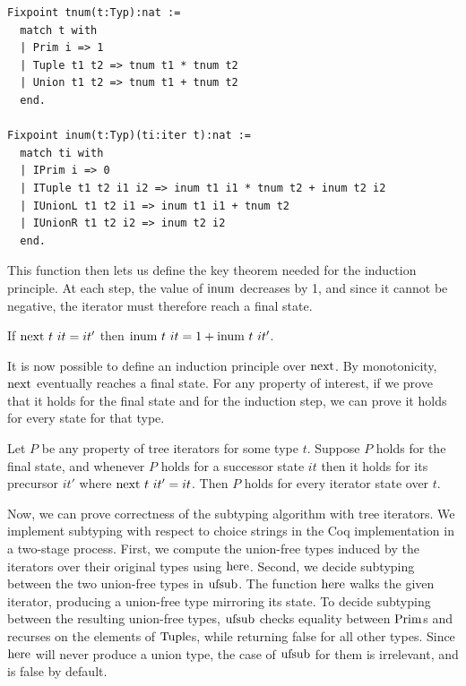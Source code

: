 \documentclass[a4paper,english]{lipics-v2019}
\renewcommand{\c}[1]{\ensuremath{\text{\lstinline{#1}}}\xspace}
\begin{document}
\begin{lstlisting}
Fixpoint tnum(t:Typ):nat :=
  match t with
  | Prim i => 1
  | Tuple t1 t2 => tnum t1 * tnum t2
  | Union t1 t2 => tnum t1 + tnum t2
  end.

Fixpoint inum(t:Typ)(ti:iter t):nat :=
  match ti with
  | IPrim i => 0
  | ITuple t1 t2 i1 i2 => inum t1 i1 * tnum t2 + inum t2 i2
  | IUnionL t1 t2 i1 => inum t1 i1 + tnum t2
  | IUnionR t1 t2 i2 => inum t2 i2
  end.
\end{lstlisting}

\noindent This function then lets us define the key theorem needed for the
induction principle. At each step, the value of \c{inum} decreases by 1, and
since it cannot be negative, the iterator must therefore reach a final
state.

\begin{lemma}[Monotonicity]\label{inum_mono}
If $\c{next}~t~it = it'$ then $\c{inum}~t~it = 1 + \c{inum}~t~it'$.
\end{lemma}

\noindent
It is now possible to define an induction principle over \c{next}. By
monotonicity, \c{next} eventually reaches a final state.  For any property
of interest, if we prove that it holds for the final state and for the
induction step, we can prove it holds for every state for that type.

\begin{theorem}\label{indprop}
Let $P$ be any property of tree iterators for some type $t$.  Suppose $P$
holds for the final state, and whenever $P$ holds for a successor state $it$
then it holds for its precursor $it'$ where $\c{next}~t~it' = it$.  Then $P$
holds for every iterator state over $t$.
\end{theorem} 

\noindent Now, we can prove correctness of the subtyping algorithm with tree
iterators. We implement subtyping with respect to choice strings in the Coq
implementation in a two-stage process. First, we compute the union-free types
induced by the iterators over their original types using \c{here}. Second, we
decide subtyping between the two union-free types in \c{ufsub}. The function
\c{here} walks the given iterator, producing a union-free type mirroring its
state.  To decide subtyping between the resulting union-free types, \c{ufsub}
checks equality between \c{Prim}\hspace{-0.3em}s and recurses on the elements
of \c{Tuple}\hspace{-0.3em}s, while returning false for all other types. Since
\c{here} will never produce a union type, the case of \c{ufsub} for them is
irrelevant, and is false by default.
\end{document}
